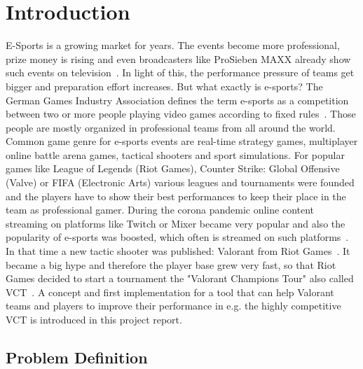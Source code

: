 \chapter{Introduction}\label{chpt:introduction}
\glsresetall

E-Sports is a growing market for years. The events become more professional, prize money is rising 
and even broadcasters like ProSieben MAXX already show such events on 
television~\cite{kovacevic}. In light of this, the performance pressure of teams get bigger and 
preparation effort increases. But what exactly is e-sports? The German Games Industry Association 
defines the term e-sports as a competition between two or more people playing video games 
according to fixed rules~\cite{kovacevic}. Those people are mostly organized in professional teams 
from all around the world. Common game genre for e-sports events are real-time strategy games, 
multiplayer online battle arena games, tactical shooters and sport simulations. For popular games 
like League of Legends (Riot Games), Counter Strike: Global Offensive (Valve) or FIFA (Electronic 
Arts)  various leagues and tournaments were founded and the players have to show their best 
performances to keep their place in the team as professional gamer. During the corona pandemic 
online content streaming on platforms like Twitch or Mixer became very popular and also the 
popularity of e-sports was boosted, which often is streamed on such platforms~\cite{kovacevic}. In 
that time a new tactic shooter was published: Valorant from Riot Games~\cite{riotgames-valorant}. It 
became a big hype and therefore the player base grew very fast, so that Riot Games decided to start 
a tournament the "Valorant Champions Tour" also called VCT~\cite{riotgames-vct}. A concept and 
first implementation for a tool that can help Valorant teams and players to improve their performance 
in e.g. the highly competitive VCT is introduced in this project report.

\section{Problem Definition}\label{sec:intro:problem}

